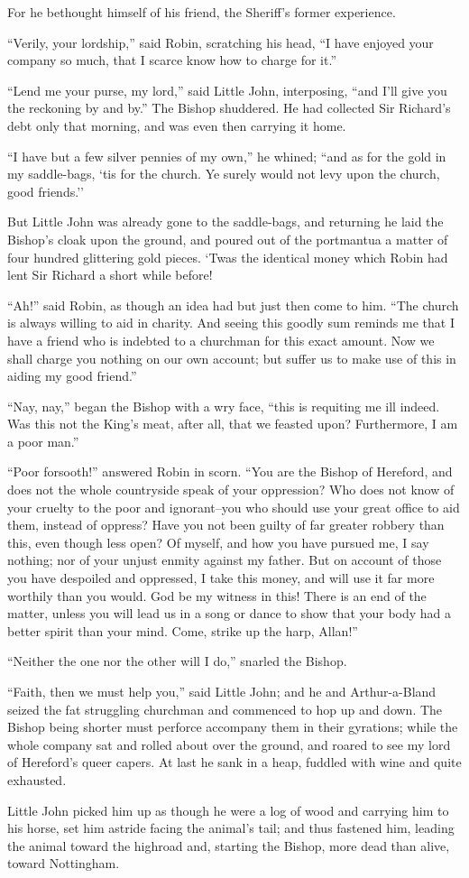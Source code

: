 For he bethought himself of his friend, the Sheriff's former experience.

``Verily, your lordship,'' said Robin, scratching his head, ``I have
enjoyed your company so much, that I scarce know how to charge for it.''

``Lend me your purse, my lord,'' said Little John, interposing, ``and
I'll give you the reckoning by and by.'' The Bishop shuddered. He had
collected Sir Richard's debt only that morning, and was even then
carrying it home.

``I have but a few silver pennies of my own,'' he whined; ``and as for
the gold in my saddle-bags, `tis for the church. Ye surely would not
levy upon the church, good friends.''

But Little John was already gone to the saddle-bags, and returning he
laid the Bishop's cloak upon the ground, and poured out of the
portmantua a matter of four hundred glittering gold pieces. `Twas the
identical money which Robin had lent Sir Richard a short while before!

``Ah!'' said Robin, as though an idea had but just then come to him.
``The church is always willing to aid in charity. And seeing this goodly
sum reminds me that I have a friend who is indebted to a churchman for
this exact amount. Now we shall charge you nothing on our own account;
but suffer us to make use of this in aiding my good friend.''

``Nay, nay,'' began the Bishop with a wry face, ``this is requiting me
ill indeed. Was this not the King's meat, after all, that we feasted
upon? Furthermore, I am a poor man.''

``Poor forsooth!'' answered Robin in scorn. ``You are the Bishop of
Hereford, and does not the whole countryside speak of your oppression?
Who does not know of your cruelty to the poor and ignorant--you who
should use your great office to aid them, instead of oppress? Have you
not been guilty of far greater robbery than this, even though less open?
Of myself, and how you have pursued me, I say nothing; nor of your
unjust enmity against my father. But on account of those you have
despoiled and oppressed, I take this money, and will use it far more
worthily than you would. God be my witness in this! There is an end of
the matter, unless you will lead us in a song or dance to show that your
body had a better spirit than your mind. Come, strike up the harp,
Allan!''

``Neither the one nor the other will I do,'' snarled the Bishop.

``Faith, then we must help you,'' said Little John; and he and
Arthur-a-Bland seized the fat struggling churchman and commenced to hop
up and down. The Bishop being shorter must perforce accompany them in
their gyrations; while the whole company sat and rolled about over the
ground, and roared to see my lord of Hereford's queer capers. At last he
sank in a heap, fuddled with wine and quite exhausted.

Little John picked him up as though he were a log of wood and carrying
him to his horse, set him astride facing the animal's tail; and thus
fastened him, leading the animal toward the highroad and, starting the
Bishop, more dead than alive, toward Nottingham.
